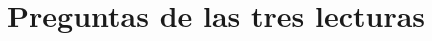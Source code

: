 \documentclass[12pt]{book} %
\begin{document}






%
%

\clearpage
\thispagestyle{empty} %
\mbox{}               %
\clearpage


\section*{Preguntas de las tres lecturas}
\end{document}

